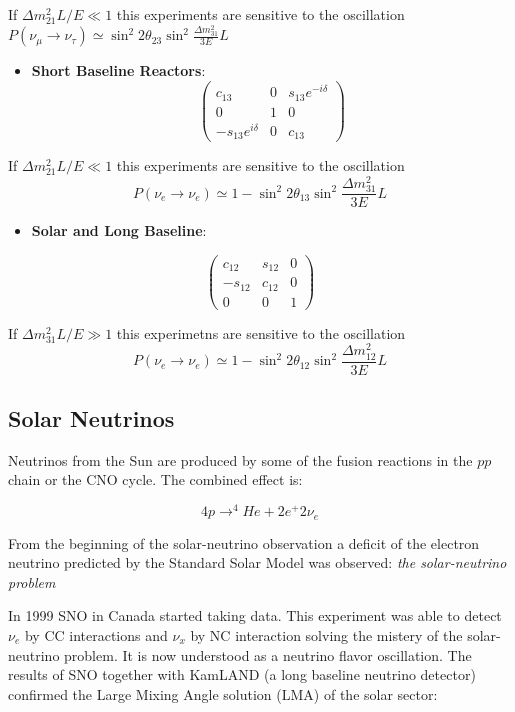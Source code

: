 \documentclass[
  letterpaper,
  DIV=11,
  numbers=noendperiod]{scrreprt}
\providecommand{\tightlist}{%
  \setlength{\itemsep}{0pt}\setlength{\parskip}{0pt}}\usepackage{longtable,booktabs,array}
\begin{document}
If \(\Delta m_{21}^2L/E \ll 1\) this experiments are sensitive to the
oscillation
\(P(\nu_\mu \rightarrow \nu_\tau) \simeq \sin^2 2\theta_{23}\sin^2\frac{\Delta m_{31}^2}{3E}L\)

\begin{itemize}
\tightlist
\item
  \textbf{Short Baseline Reactors}:
  \[\begin{pmatrix} c_{13} & 0 & s_{13}e^{-i\delta}\\ 0 & 1 & 0\\ -s_{13}e^{i\delta} & 0 & c_{13}\end{pmatrix}\]
\end{itemize}

If \(\Delta m_{21}^2L/E \ll 1\) this experiments are sensitive to the
oscillation
\[ P(\nu_e \rightarrow \nu_e) \simeq 1 - \sin^2 2\theta_{13}\sin^2\frac{\Delta m_{31}^2}{3E}L\]

\begin{itemize}
\tightlist
\item
  \textbf{Solar and Long Baseline}:
\end{itemize}

\[\begin{pmatrix} c_{12} & s_{12} & 0 \\ -s_{12} & c_{12} & 0 \\ 0 & 0 & 1 \end{pmatrix}\]

If \(\Delta m_{31}^2L/E \gg 1\) this experimetns are sensitive to the
oscillation
\[ P(\nu_e \rightarrow \nu_e) \simeq 1 - \sin^2 2\theta_{12}\sin^2\frac{\Delta m_{12}^2}{3E}L\]

\subsection*{Solar Neutrinos}\label{solar-neutrinos}

Neutrinos from the Sun are produced by some of the fusion reactions in
the \(pp\) chain or the CNO cycle. The combined effect is:

\[4p \rightarrow ^4He + 2e^+ 2\nu_e\]

From the beginning of the solar-neutrino observation a deficit of the
electron neutrino predicted by the Standard Solar Model was observed:
\emph{the solar-neutrino problem}

In 1999 SNO in Canada started taking data. This experiment was able to
detect \(\nu_e\) by CC interactions and \(\nu_x\) by NC interaction
solving the mistery of the solar-neutrino problem. It is now understood
as a neutrino flavor oscillation. The results of SNO together with
KamLAND (a long baseline neutrino detector) confirmed the Large Mixing
Angle solution (LMA) of the solar sector:
\end{document}
